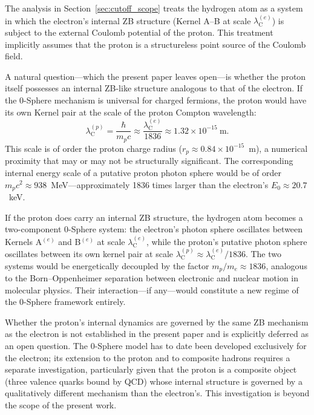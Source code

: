 \documentclass[%
 reprint, amsmath,amssymb, aps, prb, ]{revtex4-2}
\numberwithin{equation}{section}
\newcommand{\lambdaC}{\lambda_{\mathrm{C}}}
\begin{document}
The analysis in Section~\ref{sec:cutoff_scope} treats the hydrogen atom as a system in which the electron's internal ZB structure (Kernel A--B at scale $\lambdaC^{(e)}$) is subject to the external Coulomb potential of the proton. This treatment implicitly assumes that the proton is a structureless point source of the Coulomb field.

A natural question---which the present paper leaves open---is whether the proton itself possesses an internal ZB-like structure analogous to that of the electron. If the 0-Sphere mechanism is universal for charged fermions, the proton would have its own Kernel pair at the scale of the proton Compton wavelength:
\begin{equation}
\lambdaC^{(p)} = \frac{\hbar}{m_p c} \approx \frac{\lambdaC^{(e)}}{1836} \approx 1.32\times10^{-15}\ \text{m}.
\label{eq:proton_compton}
\end{equation}
This scale is of order the proton charge radius ($r_p \approx 0.84\times10^{-15}$~m), a numerical proximity that may or may not be structurally significant. The corresponding internal energy scale of a putative proton photon sphere would be of order $m_p c^2 \approx 938$~MeV---approximately 1836 times larger than the electron's $E_0 \approx 20.7$~keV.

If the proton does carry an internal ZB structure, the hydrogen atom becomes a two-component 0-Sphere system: the electron's photon sphere oscillates between Kernels A$^{(e)}$ and B$^{(e)}$ at scale $\lambdaC^{(e)}$, while the proton's putative photon sphere oscillates between its own kernel pair at scale $\lambdaC^{(p)} \approx \lambdaC^{(e)}/1836$. The two systems would be energetically decoupled by the factor $m_p/m_e \approx 1836$, analogous to the Born--Oppenheimer separation between electronic and nuclear motion in molecular physics. Their interaction---if any---would constitute a new regime of the 0-Sphere framework entirely.

Whether the proton's internal dynamics are governed by the same ZB mechanism as the electron is not established in the present paper and is explicitly deferred as an open question. The 0-Sphere model has to date been developed exclusively for the electron; its extension to the proton and to composite hadrons requires a separate investigation, particularly given that the proton is a composite object (three valence quarks bound by QCD) whose internal structure is governed by a qualitatively different mechanism than the electron's. This investigation is beyond the scope of the present work.

\clearpage

\end{document}
